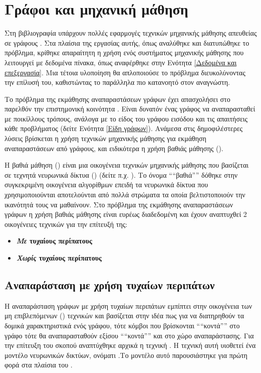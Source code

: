 \section{Γράφοι και μηχανική μάθηση}

Στη βιβλιογραφία υπάρχουν πολλές εφαρμογές τεχνικών μηχανικής μάθησης απευθείας  σε
γράφους \cite{zhang2018deep}. Στα πλαίσια της εργασίας αυτής, όπως αναλύθηκε και διατυπώθηκε
το πρόβλημα, κρίθηκε απαραίτητη η χρήση ενός συστήματος μηχανικής μάθησης που λειτουργεί
με δεδομένα πίνακα, όπως αναφέρθηκε στην Ενότητα \ref{Δεδομένα και επεξεργασία}. Μια 
τέτοια υλοποίηση θα απλοποιούσε το πρόβλημα διευκολύνοντας την επίλυσή του, καθιστώντας
το παράλληλα πιο κατανοητό στον αναγνώστη.

Το πρόβλημα της εκμάθησης αναπαραστάσεων γράφων έχει απασχολήσει στο παρελθόν την
επιστημονική κοινότητα \cite{cai2017comprehensive}. Είναι δυνατόν ένας γράφος να 
αναπαρασταθεί με ποικίλλους τρόπους, ανάλογα με το είδος του γράφου εισόδου και
τις απαιτήσεις κάθε προβλήματος (δείτε Ενότητα \ref{Είδη γράφων}). Ανάμεσα στις δημοφιλέστερες
λύσεις βρίσκεται η χρήση τεχνικών μηχανικής μάθησης για εκμάθηση αναπαραστάσεων 
από γράφους, και ειδικότερα η χρήση βαθιάς μάθησης (). 

Η βαθιά μάθηση () είναι μια οικογένεια τεχνικών μηχανικής μάθησης που
βασίζεται σε τεχνητά νευρωνικά δίκτυα ()
(δείτε π.χ. \cite{Schmidhuber2015DeepLI} \cite{Goodfellow2015DeepL}). Το όνομα ````βαθιά'''' δόθηκε
στην συγκεκριμένη οικογένεια αλγορίθμων επειδή τα νευρωνικά δίκτυα που χρησιμοποιούνται
αποτελούνται από πολλά στρώματα τα οποία βελτιστοποιούν την ικανότητά τους να μαθαίνουν.
Στο πρόβλημα της εκμάθησης αναπαραστάσεων γράφων η χρήση βαθιάς μάθησης είναι
ευρέως διαδεδομένη και έχουν αναπτυχθεί 2 οικογένειες τεχνικών για την επίτευξή της:

\begin{itemize}
    \item \textbf{\emph{Με} τυχαίους περίπατους}
    \item \textbf{\emph{Χωρίς} τυχαίους περίπατους}
\end{itemize}

\subsection{Αναπαράσταση με χρήση τυχαίων περιπάτων}

Η αναπαράσταση γράφων με χρήση τυχαίων περιπάτων εμπίπτει στην οικογένεια των 
μη επιβλεπόμενων () τεχνικών και βασίζεται στην ιδέα πως για να διατηρηθούν
τα δομικά χαρακτηριστικά ενός γράφου, τότε κόμβοι που βρίσκονται ````κοντά'''' στο γράφο τότε
θα αναπαρασταθούν εξίσου ````κοντά'''' και στο χώρο αναπαράστασης. Για την επίτευξη του σκοπού
αναπτύχθηκε αρχικά η τεχνική  \cite{DeepWalk}. Η τεχνική αυτή υιοθετεί 
ένα μοντέλο νευρωνικών δικτύων, ονόματι .Το μοντέλο αυτό
παρουσιάστηκε για πρώτη φορά στα πλαίσια του  \cite{word2vec}.

